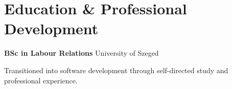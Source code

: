 \section{Education \& Professional Development}

\textbf{BSc in Labour Relations}
\hfill
{\color{subtle} University of Szeged}

Transitioned into software development through self-directed study and professional experience.
